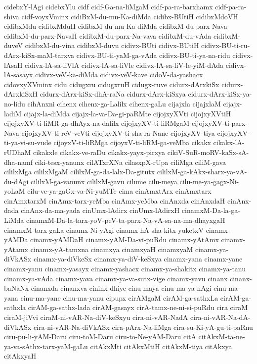 {cidebxY-lAgi
cidebxYlu
cidf
cidf-Ga-na-liMgaM
cidf-pa-ra-barxhamx
cidf-pa-ra-shiva
cidf-voyxVminx
cidiBxM-du-mu-Ka-diMda
cidibx-BUtiH
cidibxMdoVH
cidibxMdu
cidibxMduH
cidibxM-du-mu-Ka-diMda
cidibxM-du-parx-Nava
cidibxM-du-parx-NavaH
cidibxM-du-parx-Na-vava
cidibxM-du-vAda
cidibxM-duveV
cidibxM-du-vina
cidibxM-duvu
cidivx-BUti
cidivx-BUtiH
cidivx-BU-ti-ru-dArx-kiSx-maM-tarxva
cidivx-BU-ti-yaM-ga-vAda
cidivx-BU-ti-ya-na-ridu
cidivx-lAsaH
cidivx-lA-sa-liVlA
cidivx-lA-sa-liVle
cidivx-lA-sa-liV-le-yiM-dAda
cidivx-lA-sasayx
cidivx-veV-ka-diMda
cidivx-veV-kave
cidoV-da-yashacx
cidovxyXVminx
cidu
cidugxru
cidugxruH
cidugx-ruve
cidurx-dArxkiSx
cidurx-dArxkiSxH
cidurx-dArx-kiSx-dhA-raNa
cidurx-dArx-kiSxya
cidurx-dArx-kiSx-ya-no-lidu
cihAnxni
cihenx
cihenx-ga-Lalilx
cihenx-gaLu
cijajxla
cijajxlaM
cijajx-ladiM
cijajx-la-diMda
cijajx-la-va-Da-gi-paRMte
cijojxyXVti
cijojxyXVtiH
cijojxyXV-ti-liMR-ga-dhAyx-na-dalilx
cijojxyXV-ti-liRMgaM
cijojxyXV-ti-parx-Nava
cijojxyXV-ti-reV-veVti
cijojxyXV-ti-sha-ra-Nane
cijojxyXV-tiya
cijojxyXV-ti-ya-vi-su-vude
cijoyxV-ti-liRMga
cijoyxV-ti-liRM-ga-veMba
cikakx
cikakx-lA-rUDhaM
cikakxle
cikakx-ve-raDu
cikakx-yayx-pirxya
cikiV-SuR-moRV-kaSx-sA-dha-namf
ciki-tesx-yanunx
cilATxrXNa
cilasxpX-rUpa
ciliMga
ciliM-gava
cililxMga
cililxMgaM
cililxM-ga-da-lalx-Da-gitutx
cililxM-ga-kAkx-sharx-ya-vA-du-dAgi
cililxM-ga-vanunx
cililxM-gavu
cilume
cilu-meya
cilu-me-ya-gagx-Ni-yoLaM
cilu-ve-ya-gaGx-va-Ni-yuMTe
cima
cinAmxtArx
cinAmxtarx
cinAmxtarxM
cinAmx-tarx-yeMba
cinAmx-yeMba
cinAnxda
cinAnxdaH
cinAnx-dada
cinAnx-da-ma-yada
cinUmx-lAdirx
cinUmx-lAdirxH
cinamxM-Da-la-ga-LiMda
cinamxM-Da-la-tarx-yoV-peV-ta-parx-Na-vA-sa-na-ma-dhayxgaH
cinamxM-tarx-gaLa
cinamx-Ni-yAgi
cinamx-hA-sha-kitx-yuketxV
cinamx-yAMDa
cinamx-yAMDaH
cinamx-yAM-Da-vi-puRdu
cinamx-yAtAmx
cinamx-yAtamx
cinamx-yA-tamxna
cinamxya
cinamxyaH
cinamxyaM
cinamx-ya-diVkASx
cinamx-ya-diVkeSx
cinamx-ya-diV-keSxya
cinamx-yana
cinamx-yane
cinamx-yanu
cinamx-yasayx
cinamx-yashacx
cinamx-ya-shakitx
cinamx-ya-tanu
cinamx-ya-vAda
cinamx-yava
cinamx-ya-va-sutx-vige
cinamx-yavu
cinanx
cinanx-baNaNx
cinanxda
cinanxva
cininx-dhiye
cinu-maya
cinu-ma-ya-nAgi
cinu-ma-yana
cinu-ma-yane
cinu-ma-yanu
cipupx
cirAMgaM
cirAM-ga-sathxLa
cirAM-ga-sathxla
cirAM-ga-sathx-lada
cirAM-gasayx
cirA-tamx-ne-ni-si-puRdu
cira
ciraM
ciraM-jiVvi
ciraM-ni-vAR-Na-diV-keSxyu
cira-ni-vAR-NadA
cira-ni-vAR-Na-dA-diVkASx
cira-ni-vAR-Na-diVkASx
cira-pArx-Na-liMga
cira-su-Ki-yA-gu-ti-paRnu
ciru-pu-li-yAM-Daru
ciru-toM-Daru
ciru-to-Ne-yAM-Daru
citA
citAkxM-ta-ne-ya-va-sAthx-tarx-yaM-gaLu
citAkxMti
citAkxMtiH
citAkxM-tiya
citAkxya
citAkxyaH
}
